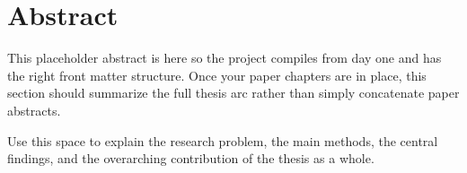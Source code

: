 \chapter*{Abstract}


This placeholder abstract is here so the project compiles from day one and has the right front matter structure.
Once your paper chapters are in place, this section should summarize the full thesis arc rather than simply concatenate paper abstracts.

Use this space to explain the research problem, the main methods, the central findings, and the overarching contribution of the thesis as a whole.

